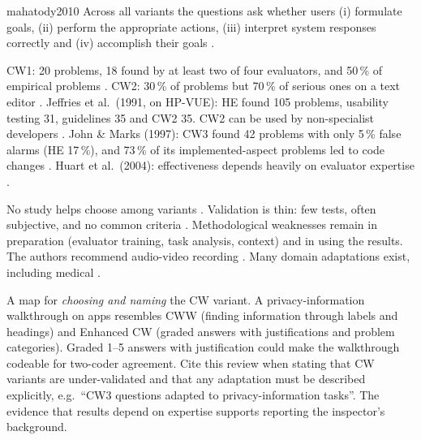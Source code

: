 \begin{papercard}{mahatody2010}
 Across all variants the questions ask whether users (i) formulate goals, (ii) perform the appropriate actions, (iii) interpret system responses correctly and (iv) accomplish their goals .

 CW1: 20 problems, 18 found by at least two of four evaluators, and 50\,\% of empirical problems . CW2: 30\,\% of problems but 70\,\% of serious ones on a text editor . Jeffries et al.\ (1991, on HP-VUE): HE found 105 problems, usability testing 31, guidelines 35 and CW2 35. CW2 can be used by non-specialist developers . John \& Marks (1997): CW3 found 42 problems with only 5\,\% false alarms (HE 17\,\%), and 73\,\% of its implemented-aspect problems led to code changes . Huart et al.\ (2004): effectiveness depends heavily on evaluator expertise .

 No study helps choose among variants . Validation is thin: few tests, often subjective, and no common criteria . Methodological weaknesses remain in preparation (evaluator training, task analysis, context) and in using the results. The authors recommend audio-video recording . Many domain adaptations exist, including medical .

 A map for \emph{choosing and naming} the CW variant. A privacy-information walkthrough on apps resembles CWW (finding information through labels and headings) and Enhanced CW (graded answers with justifications and problem categories). Graded 1--5 answers with justification could make the walkthrough codeable for two-coder agreement. Cite this review when stating that CW variants are under-validated and that any adaptation must be described explicitly, e.g.\ ``CW3 questions adapted to privacy-information tasks''. The evidence that results depend on expertise supports reporting the inspector's background.
\end{papercard}
